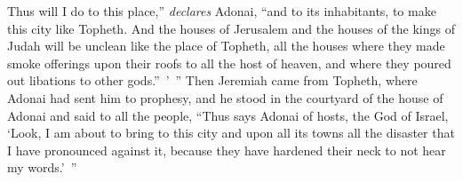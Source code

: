 \begin{biblechapter}
\verse Thus will I do to this place,” \textit{declares} Adonai, “and to its inhabitants, to make this city like Topheth.
\verse And the houses of Jerusalem and the houses of the kings of Judah will be unclean like the place of Topheth, all the houses where they made smoke offerings upon their roofs to all the host of heaven, and where they poured out libations to other gods.” ’ ”
\verse Then Jeremiah came from Topheth, where Adonai had sent him to prophesy, and he stood in the courtyard of the house of Adonai and said to all the people,
\verse “Thus says Adonai of hosts, the God of Israel, ‘Look, I am about to bring to this city and upon all its towns all the disaster that I have pronounced against it, because they have hardened their neck to not hear my words.’ ”
\end{biblechapter}

